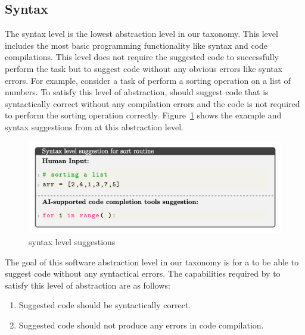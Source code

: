\subsection{Syntax}
\label{syntax}
The syntax level is the lowest abstraction level in our taxonomy. This level includes the most basic programming functionality like syntax and code compilations. This level does not require the \cct{} suggested code to successfully perform the task but to suggest code without any obvious errors like syntax errors.
For example, consider a task of perform a sorting operation on a list of numbers. To satisfy this level of abstraction, \cct{} should suggest code that is syntactically correct without any compilation errors and the code is not required to perform the sorting operation correctly. 
Figure~\ref{fig:syntax} shows the example and syntax suggestions from \cct{} at this abstraction level.

\begin{figure}[hbt!]
    \centering
    \includegraphics[width=\linewidth]{Figures/syntax.png}
    \caption{\cct{} syntax level suggestions}
    \label{fig:syntax}
\end{figure}

The goal of this software abstraction level in our taxonomy is for a \cct{} to be able to suggest code without any syntactical errors.
The capabilities required by \cct{} to satisfy this level of abstraction are as follows:

\begin{enumerate}
    \item Suggested code should be syntactically correct.
    \item Suggested code should not produce any errors in code compilation.
\end{enumerate}

